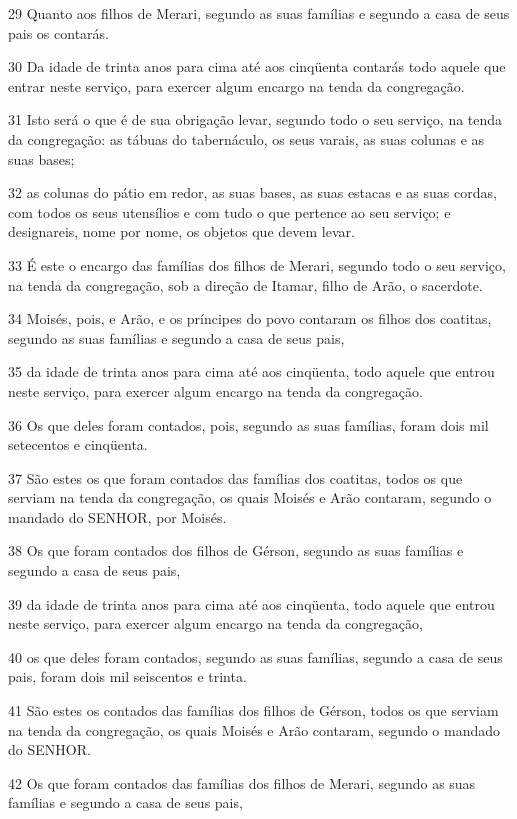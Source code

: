 \par 29 Quanto aos filhos de Merari, segundo as suas famílias e segundo a casa de seus pais os contarás.
\par 30 Da idade de trinta anos para cima até aos cinqüenta contarás todo aquele que entrar neste serviço, para exercer algum encargo na tenda da congregação.
\par 31 Isto será o que é de sua obrigação levar, segundo todo o seu serviço, na tenda da congregação: as tábuas do tabernáculo, os seus varais, as suas colunas e as suas bases;
\par 32 as colunas do pátio em redor, as suas bases, as suas estacas e as suas cordas, com todos os seus utensílios e com tudo o que pertence ao seu serviço; e designareis, nome por nome, os objetos que devem levar.
\par 33 É este o encargo das famílias dos filhos de Merari, segundo todo o seu serviço, na tenda da congregação, sob a direção de Itamar, filho de Arão, o sacerdote.
\par 34 Moisés, pois, e Arão, e os príncipes do povo contaram os filhos dos coatitas, segundo as suas famílias e segundo a casa de seus pais,
\par 35 da idade de trinta anos para cima até aos cinqüenta, todo aquele que entrou neste serviço, para exercer algum encargo na tenda da congregação.
\par 36 Os que deles foram contados, pois, segundo as suas famílias, foram dois mil setecentos e cinqüenta.
\par 37 São estes os que foram contados das famílias dos coatitas, todos os que serviam na tenda da congregação, os quais Moisés e Arão contaram, segundo o mandado do SENHOR, por Moisés.
\par 38 Os que foram contados dos filhos de Gérson, segundo as suas famílias e segundo a casa de seus pais,
\par 39 da idade de trinta anos para cima até aos cinqüenta, todo aquele que entrou neste serviço, para exercer algum encargo na tenda da congregação,
\par 40 os que deles foram contados, segundo as suas famílias, segundo a casa de seus pais, foram dois mil seiscentos e trinta.
\par 41 São estes os contados das famílias dos filhos de Gérson, todos os que serviam na tenda da congregação, os quais Moisés e Arão contaram, segundo o mandado do SENHOR.
\par 42 Os que foram contados das famílias dos filhos de Merari, segundo as suas famílias e segundo a casa de seus pais,
